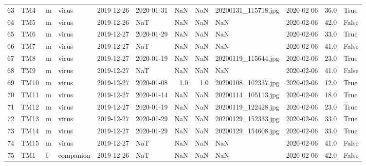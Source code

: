 \begin{longtable}{llllllrrllrl}
63 &    TM4 &   m &      virus &   2019-12-26 & 2020-01-31 &               NaN &                  NaN &      20200131\_115718.jpg &        2020-02-06 &  36.0 &   True \\
64 &    TM5 &   m &      virus &   2019-12-26 &        NaT &               NaN &                  NaN &                      NaN &        2020-02-06 &  42.0 &  False \\
65 &    TM6 &   m &      virus &   2019-12-27 & 2020-01-29 &               NaN &                  NaN &                      NaN &        2020-02-06 &  33.0 &   True \\
66 &    TM7 &   m &      virus &   2019-12-27 &        NaT &               NaN &                  NaN &                      NaN &        2020-02-06 &  41.0 &  False \\
67 &    TM8 &   m &      virus &   2019-12-27 & 2020-01-19 &               NaN &                  NaN &      20200119\_115644.jpg &        2020-02-06 &  23.0 &   True \\
68 &    TM9 &   m &      virus &   2019-12-27 &        NaT &               NaN &                  NaN &                      NaN &        2020-02-06 &  41.0 &  False \\
69 &   TM10 &   m &      virus &   2019-12-27 & 2020-01-08 &               1.0 &                  1.0 &      20200108\_102337.jpg &        2020-02-06 &  12.0 &   True \\
70 &   TM11 &   m &      virus &   2019-12-27 & 2020-01-14 &               NaN &                  NaN &      20200114\_105113.jpg &        2020-02-06 &  18.0 &   True \\
71 &   TM12 &   m &      virus &   2019-12-27 & 2020-01-19 &               NaN &                  NaN &      20200119\_122428.jpg &        2020-02-06 &  23.0 &   True \\
72 &   TM13 &   m &      virus &   2019-12-27 & 2020-01-29 &               NaN &                  NaN &      20200129\_152333.jpg &        2020-02-06 &  33.0 &   True \\
73 &   TM14 &   m &      virus &   2019-12-27 & 2020-01-29 &               NaN &                  NaN &      20200129\_154608.jpg &        2020-02-06 &  33.0 &   True \\
74 &   TM15 &   m &      virus &   2019-12-27 &        NaT &               NaN &                  NaN &                      NaN &        2020-02-06 &  41.0 &  False \\
75 &    TM1 &   f &  companion &   2019-12-26 &        NaT &               NaN &                  NaN &                      NaN &        2020-02-06 &  42.0 &  False \\

\end{longtable}
